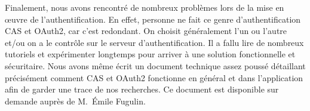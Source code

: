     Finalement, nous avons rencontré de nombreux problèmes lors de la mise en \oe{}uvre de l'authentification. En effet, personne ne fait ce genre d'authentification CAS et OAuth2, car c'est redondant. On choisit généralement l'un ou l'autre et/ou on a le contrôle sur le serveur d'authentification. Il a fallu lire de nombreux tutoriels et expérimenter longtemps pour arriver à une solution fonctionnelle et sécuritaire. Nous avons même écrit un document technique assez poussé détaillant précisément comment CAS et OAuth2 fonctionne en général et dans l'application afin de garder une trace de nos recherches. Ce document est disponible sur demande auprès de M.~Émile Fugulin.
